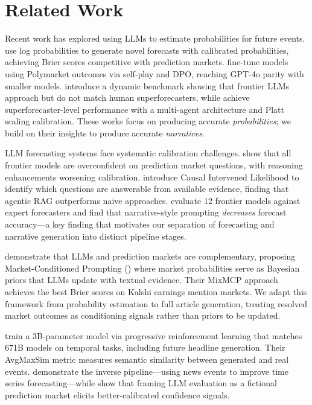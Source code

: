 \section{Related Work}
\label{sec:related}

 Recent work has explored using LLMs to estimate probabilities for future events. \citet{logprob2025} use log probabilities to generate novel forecasts with calibrated probabilities, achieving Brier scores competitive with prediction markets. \citet{outcomedriven2025} fine-tune models using Polymarket outcomes via self-play and DPO, reaching GPT-4o parity with smaller models. \citet{forecastbench2024} introduce a dynamic benchmark showing that frontier LLMs approach but do not match human superforecasters, while \citet{aiaforecaster2025} achieve superforecaster-level performance with a multi-agent architecture and Platt scaling calibration. These works focus on producing accurate \emph{probabilities}; we build on their insights to produce accurate \emph{narratives}.

 LLM forecasting systems face systematic calibration challenges. \citet{kalshibench2025} show that all frontier models are overconfident on prediction market questions, with reasoning enhancements worsening calibration. \citet{prophet2025} introduce Causal Intervened Likelihood to identify which questions are answerable from available evidence, finding that agentic RAG outperforms naive approaches. \citet{lu2025} evaluate 12 frontier models against expert forecasters and find that narrative-style prompting \emph{decreases} forecast accuracy---a key finding that motivates our separation of forecasting and narrative generation into distinct pipeline stages.

 \citet{mentionmarkets2026} demonstrate that LLMs and prediction markets are complementary, proposing Market-Conditioned Prompting (\mcp) where market probabilities serve as Bayesian priors that LLMs update with textual evidence. Their MixMCP approach achieves the best Brier scores on Kalshi earnings mention markets. We adapt this framework from probability estimation to full article generation, treating resolved market outcomes as conditioning signals rather than priors to be updated.

 \citet{timer1_2025} train a 3B-parameter model via progressive reinforcement learning that matches 671B models on temporal tasks, including future headline generation. Their AvgMaxSim metric measures semantic similarity between generated and real events. \citet{news2forecast2024} demonstrate the inverse pipeline---using news events to improve time series forecasting---while \citet{fakemarkets2025} show that framing LLM evaluation as a fictional prediction market elicits better-calibrated confidence signals.

